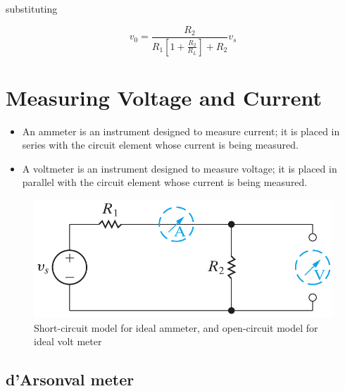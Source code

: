 \documentclass[14pt]{memoir}
\begin{document}
substituting 

\begin{equation}
v_0 = \frac{R_2}{R_1 [1 + \frac{R_2}{R_L}] + R_2} v_s
\end{equation}

\section{Measuring Voltage and Current}

\begin{itemize}
\item An ammeter is an instrument designed to measure current; it is placed in series with the circuit element whose current is being measured. 
\item A voltmeter is an instrument designed to measure voltage; it is placed in parallel with the circuit element whose current is being measured. 
\end{itemize}

\begin{figure}[H]
\begin{center}
\includegraphics[scale=0.50]{fig/fig03_24.png}
\caption{Short-circuit model for ideal ammeter, and open-circuit model for ideal volt meter}
\label{fig:fig03_24}
\end{center}
\end{figure}

\subsection{d'Arsonval meter}
\end{document}
